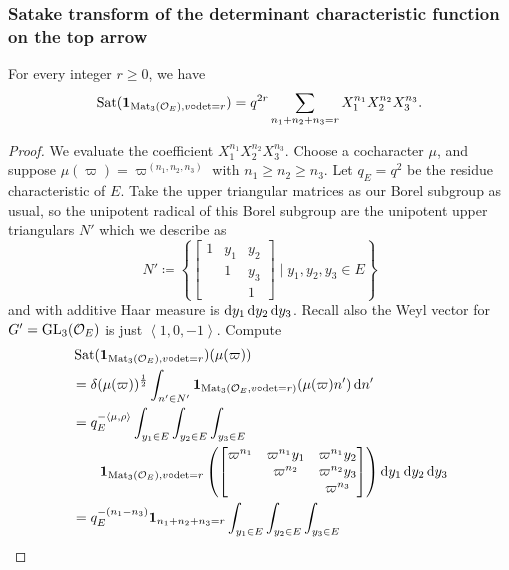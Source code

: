 \subsubsection{Satake transform of the determinant characteristic function on the top arrow}
\begin{proposition}
  For every integer $r \ge 0$, we have
  \[ \operatorname{Sat}(\mathbf{1}_{\operatorname{Mat}_3(\mathcal O_E), v\circ\det=r})
    = q^{2r} \sum_{n_1 + n_2 + n_3 = r} X_1^{n_1} X_2^{n_2} X_3^{n_3}. \]
\end{proposition}
\begin{proof}
  We evaluate the coefficient $X_1^{n_1} X_2^{n_2} X_3^{n_3}$.
  Choose a cocharacter $\mu$,
  and suppose $\mu(\varpi) = \varpi^{(n_1, n_2, n_3)}$ with $n_1 \ge n_2 \ge n_3$.
  Let $q_E = q^2$ be the residue characteristic of $E$.
  Take the upper triangular matrices as our Borel subgroup as usual,
  so the unipotent radical of this Borel subgroup
  are the unipotent upper triangulars $N'$ which we describe as
  \[ N' \coloneqq \left\{ \begin{bmatrix}
      1 & y_1 & y_2 \\
        & 1 & y_3 \\
        &   & 1 \end{bmatrix} \mid y_1, y_2, y_3 \in E \right\} \]
  and with additive Haar measure is $\odif{y_1,y_2,y_3}$.
  Recall also the Weyl vector for $G' = \operatorname{GL}_3(\mathcal O_E)$ is just $\left< 1,0,-1\right>$.
  Compute
  \begin{align*}
    &\Sat(\mathbf{1}_{\Mat_3(\OO_E), v\circ\det=r})(\mu(\varpi)) \\
    &= \delta(\mu(\varpi))^\half \int_{n' \in N'}
      \mathbf{1}_{\Mat_3(\OO_E, v\circ \det = r)} (\mu(\varpi) n') \odif{n'} \\
    &= q_E^{-\left< \mu, \rho\right>} \int_{y_1 \in E} \int_{y_2 \in E} \int_{y_3 \in E} \\
    &\qquad
      \mathbf{1}_{\Mat_3(\OO_E), v \circ \det = r}
      \left(
        \begin{bmatrix}
          \varpi^{n_1} & \varpi^{n_1} y_1 & \varpi^{n_1} y_2 \\
          & \varpi^{n_2} & \varpi^{n_2} y_3 \\
          & & \varpi^{n_3} \\
        \end{bmatrix}
      \right) \odif{y_1,y_2,y_3} \\
    &= q_E^{-(n_1-n_3)} \mathbf{1}_{n_1+n_2+n_3=r}
    \int_{y_1 \in E} \int_{y_2 \in E} \int_{y_3 \in E} \\

\end{align*}
\end{proof}
